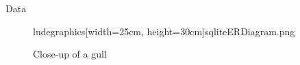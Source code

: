 \documentclass[final, 14pt]{beamer}
\newlength{\onecolwid}
\begin{document}
\begin{frame}[t]
\begin{columns}[t]
\begin{column}{\onecolwid}
\begin{block}{Data}
\begin{figure}
ludegraphics[width=25cm, height=30cm]{sqliteERDiagram.png}
  \caption{Close-up of a gull}
  \label{fig:gull}
\end{figure}


\end{block}
\end{column}
\end{columns}
\end{frame}
\end{document}
